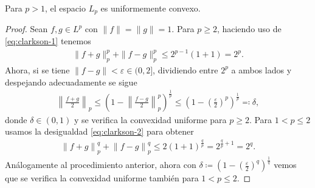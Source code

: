 \begin{corollary}
    Para $ p > 1 $, el espacio $ L_p $ es uniformemente convexo.
\end{corollary}
\begin{proof}
    Sean $ f, g \in L^p $ con $ \|f\| = \|g\| = 1 $. Para $ p \geq 2 $, haciendo uso de \eqref{eq:clarkson-1} tenemos
    \begin{align}
        \| f + g \|_p^p + \| f - g \|_p^p \leq 2^{p-1}(1 + 1) = 2^p.
    \end{align}
    Ahora, si se tiene $\|f-g\| < \varepsilon \in (0, 2] $, dividiendo entre $ 2^p $ a ambos lados y despejando adecuadamente se sigue
    \begin{align}
        \left\| \frac{f + g}{2} \right\|_p \leq \left( 1 - \left\| \frac{f - g}{2} \right\|_p^p\right)^{\frac{1}{p}} \leq \left( 1 - \left( \frac{\varepsilon}{2} \right)^p\right)^{\frac{1}{p}} \eqcolon \delta,
    \end{align}
    donde $ \delta \in (0, 1) $ y se verifica la convexidad uniforme para $ p \geq 2 $. Para $ 1 < p \leq 2 $ usamos la desigualdad \eqref{eq:clarkson-2} para obtener
    \begin{align}
        \left\| f + g \right\|_p^q + \left\| f - g \right\|_p^q \leq 2 \left(1 + 1 \right)^{\frac{q}{p}} = 2^{\frac{q}{p}+1} = 2^q.
    \end{align}
    Análogamente al procedimiento anterior, ahora con $ \delta \coloneq  \left( 1 - \left( \frac{\varepsilon}{2} \right)^q\right)^{\frac{1}{q}} $ vemos que se verifica la convexidad uniforme también para $ 1 < p \leq 2 $.
\end{proof}
